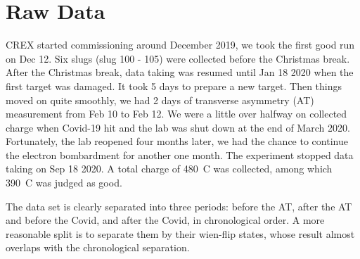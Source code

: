 \begin{comment}
    \begin{itemize}
	\item (design) PREX-II statistical width: $\sim 120\ ppm @30Hz$
	\item (design) BCM resolution: $40\ ppm$
	\item (measured) 1 MHz BCM electronics: $\sim 25\ ppm @30 Hz, 20\ \mu A$
	\item charge and position jitter
	    $$ A_Q: 100-300\ ppm \quad \Delta x: 5-25\ \mu m$$
    \end{itemize}
\end{comment}

\section{Raw Data}
CREX started commissioning around December 2019, we took the first good run on 
Dec 12. Six slugs (slug 100 - 105) were collected before the Christmas break. After 
the Christmas break, data taking was resumed until Jan 18 2020 when the first \Ca 
target was damaged. It took 5 days to prepare a new target.
Then things moved on quite smoothly, we had 2 days of transverse asymmetry (AT)
measurement from Feb 10 to Feb 12. We were a little over halfway on collected charge 
when Covid-19 hit and the lab was shut down at the end of March 2020. Fortunately,
the lab reopened four months later, we had the chance to continue the electron bombardment 
for another one month. The experiment stopped data taking on Sep 18 2020. A total charge
of 480~C was collected, among which 390~C was judged as good. 

The data set is clearly separated into three periods: before the AT, after the AT and before the Covid,
and after the Covid, in chronological order. 
A more reasonable split is to separate them by their wien-flip states, 
whose result almost overlaps with the chronological separation.

